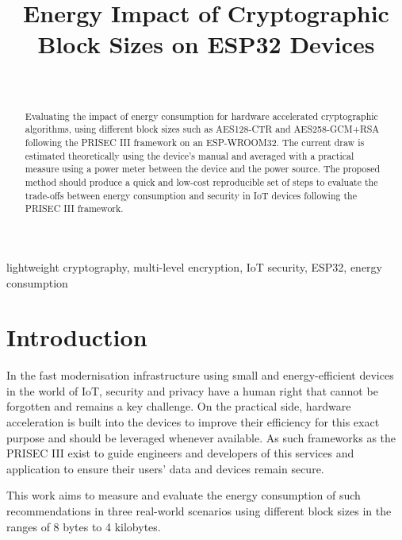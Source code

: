 \documentclass[METI_NISS]{IEEEtran}
\begin{document}
\title{Energy Impact of Cryptographic Block Sizes on ESP32 Devices\\
}

\author{ \\
}

\maketitle

\begin{abstract}
Evaluating the impact of energy consumption for hardware accelerated cryptographic algorithms, using different block sizes such as AES128-CTR and AES258-GCM+RSA following the PRISEC III framework on an ESP-WROOM32. The current draw is estimated theoretically using the device's manual and averaged with a practical measure using a power meter between the device and the power source. The proposed method should produce a quick and low-cost reproducible set of steps to evaluate the trade-offs between energy consumption and security in IoT devices following the PRISEC III framework.
\end{abstract}

\begin{IEEEkeywords}
lightweight cryptography, multi-level encryption, IoT security, ESP32, energy consumption
\end{IEEEkeywords}

\section{Introduction}
In the fast modernisation infrastructure using small and energy-efficient devices in the world of IoT, security and privacy have a human right that cannot be forgotten and remains a key challenge. On the practical side, hardware acceleration is built into the devices to improve their efficiency for this exact purpose and should be leveraged whenever available. As such frameworks as the PRISEC III\cite{sohail2025} exist to guide engineers and developers of this services and application to ensure their users' data and devices remain secure.

This work aims to measure and evaluate the energy consumption of such recommendations in three real-world scenarios using different block sizes in the ranges of 8 bytes to 4 kilobytes.
\end{document}
